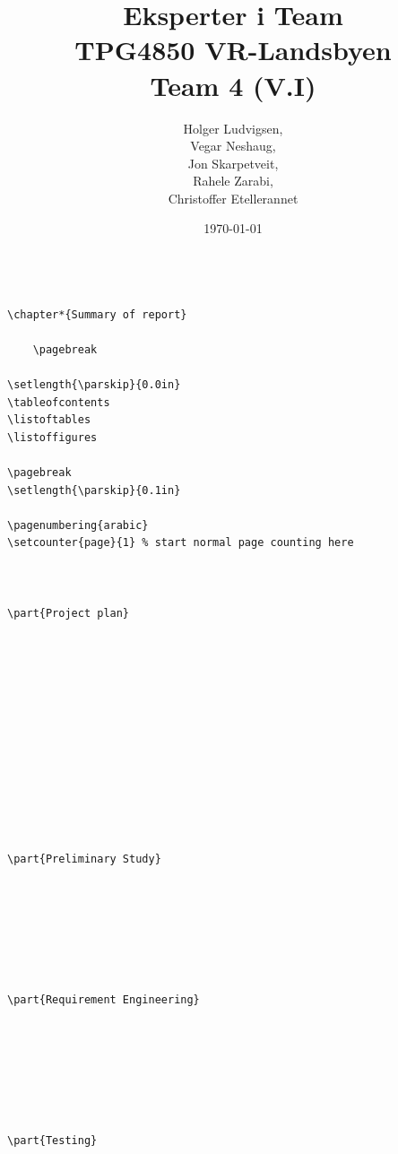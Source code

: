 \documentclass[12pt]{report}
\author{Holger Ludvigsen,\\Vegar Neshaug,\\Jon Skarpetveit,\\Rahele Zarabi,\\Christoffer Etellerannet}
\title{{\small Eksperter i Team\\TPG4850 VR-Landsbyen}\\\textbf{Team 4 (V.I)}}
\date{{\small \today}}
\begin{document}
\maketitle


\begin{verbatim}

\chapter*{Summary of report}
	
	\pagebreak
	
\setlength{\parskip}{0.0in}
\tableofcontents
\listoftables
\listoffigures

\pagebreak
\setlength{\parskip}{0.1in}

\pagenumbering{arabic}
\setcounter{page}{1} % start normal page counting here



\part{Project plan}

	
	
	
	
	
	
		
		
	
	
	
	
\part{Preliminary Study}

	
	
	
	
	
	
\part{Requirement Engineering}

	

	
	
	
	
\part{Testing}


\end{verbatim}
\end{document}
